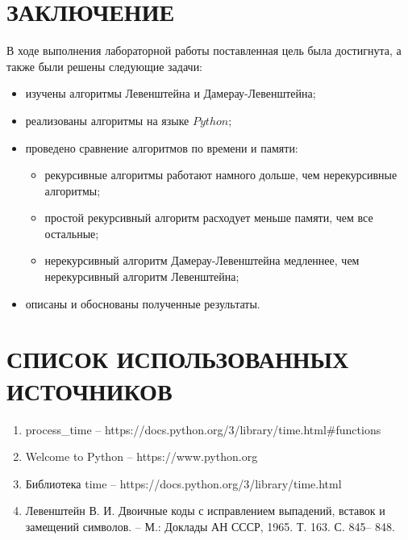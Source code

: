 \documentclass{article}
\begin{document}
\clearpage\section*{ЗАКЛЮЧЕНИЕ}
В ходе выполнения лабораторной работы поставленная цель была достигнута, а также были решены следующие задачи:
\begin{itemize}
	\item изучены алгоритмы Левенштейна и Дамерау-Левенштейна;
	\item реализованы алгоритмы на языке $Python$; 
	\item проведено сравнение алгоритмов по времени и памяти:
	\begin{itemize}
		\item рекурсивные алгоритмы работают намного дольше, чем нерекурсивные алгоритмы;
		\item простой рекурсивный алгоритм расходует меньше  памяти, чем все остальные;
		\item нерекурсивный алгоритм Дамерау-Левенштейна медленнее, чем нерекурсивный алгоритм Левенштейна;
	\end{itemize}
	\item описаны и обоснованы полученные результаты.
\end{itemize} 

\clearpage\section*{СПИСОК ИСПОЛЬЗОВАННЫХ ИСТОЧНИКОВ}
\begin{enumerate}
	\item process\_time --  https://docs.python.org/3/library/time.html\#functions
	\item Welcome to Python -- https://www.python.org
	\item	Библиотека time -- https://docs.python.org/3/library/time.html
	\item	Левенштейн В. И. Двоичные коды с исправлением выпадений, вставок и замещений символов. – М.: Доклады АН 
	СССР, 1965. Т. 163. С. 845– 848.
\end{enumerate}
\end{document}

